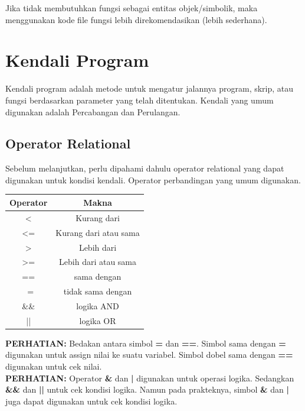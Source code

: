 \documentclass[12pt]{book}
\begin{document}
	Jika tidak membutuhkan fungsi sebagai entitas objek/simbolik, maka menggunakan kode file fungsi lebih direkomendasikan (lebih sederhana). 
	
	\newpage
	\section{Kendali Program}
	
	Kendali program adalah metode untuk mengatur jalannya program, skrip, atau fungsi berdasarkan parameter yang telah ditentukan.
	Kendali yang umum digunakan adalah Percabangan dan Perulangan.
	
	\subsection{Operator Relational}
	
	Sebelum melanjutkan, perlu dipahami dahulu operator relational yang dapat digunakan untuk kondisi kendali.
	Operator perbandingan yang umum digunakan.
	
	\begin{center}
		\begin{tabular}{|c|c|}
			\hline
			Operator & Makna \\
			\hline\hline
			< & Kurang dari \\
			\hline
			<= & Kurang dari atau sama \\
			\hline
			> & Lebih dari \\
			\hline
			>= & Lebih dari atau sama \\
			\hline
			== & sama dengan \\
			\hline
			~= & tidak sama dengan \\
			\hline
			\&\& & logika AND \\
			\hline
			|| & logika OR \\
			\hline
		\end{tabular}
	\end{center}

	\textbf{PERHATIAN:} Bedakan antara simbol \textbf{=} dan \textbf{==}.
	Simbol sama dengan \textbf{=} digunakan untuk assign nilai ke suatu variabel.
	Simbol dobel sama dengan \textbf{==} digunakan untuk cek nilai.\\
	
	\textbf{PERHATIAN:} Operator \textbf{\&} dan \textbf{|} digunakan untuk operasi logika.
	Sedangkan \textbf{\&\&} dan \textbf{||} untuk cek kondisi logika.
	Namun pada prakteknya, simbol \textbf{\&} dan \textbf{|} juga dapat digunakan untuk cek kondisi logika.
	
\end{document}
